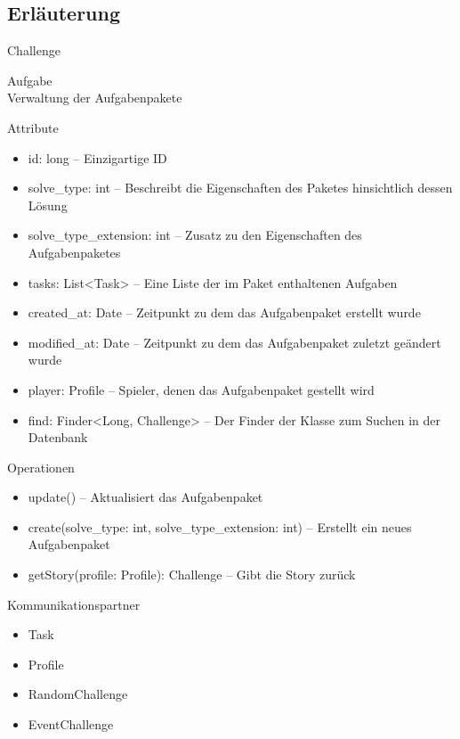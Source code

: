 \subsection{Erläuterung}
\begin{class}{20}{Challenge}
\item[Aufgabe]~\\
Verwaltung der Aufgabenpakete
\item[Attribute]~\\
\begin{itemize}
\item id: long -- Einzigartige ID
\item solve\_type: int -- Beschreibt die Eigenschaften des Paketes hinsichtlich dessen Lösung
\item solve\_type\_extension: int -- Zusatz zu den Eigenschaften des Aufgabenpaketes
\item tasks: List<Task> -- Eine Liste der im Paket enthaltenen Aufgaben
\item created\_at: Date -- Zeitpunkt zu dem das Aufgabenpaket erstellt wurde
\item modified\_at: Date -- Zeitpunkt zu dem das Aufgabenpaket zuletzt geändert wurde
\item player: Profile -- Spieler, denen das Aufgabenpaket gestellt wird
\item find: Finder<Long, Challenge> -- Der Finder der Klasse zum Suchen in der Datenbank
\end{itemize}
\item[Operationen]~\\
\begin{itemize}
\item update() -- Aktualisiert das Aufgabenpaket
\item create(solve\_type: int, solve\_type\_extension: int) -- Erstellt ein neues Aufgabenpaket
\item getStory(profile: Profile): Challenge -- Gibt die Story zurück
\end{itemize}
\item[Kommunikationspartner]~\\
\begin{itemize}
\item Task
\item Profile
\item RandomChallenge
\item EventChallenge
\end{itemize}
\end{class}

